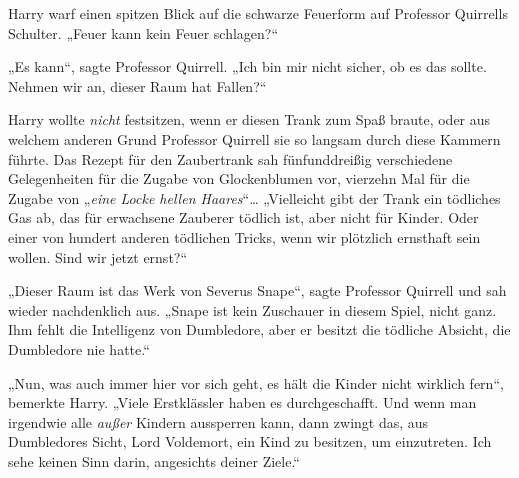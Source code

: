 Harry warf einen spitzen Blick auf die schwarze Feuerform auf Professor Quirrells Schulter. „Feuer kann kein Feuer schlagen?“

„Es kann“, sagte Professor Quirrell. „Ich bin mir nicht sicher, ob es das sollte. Nehmen wir an, dieser Raum hat Fallen?“

Harry wollte \emph{nicht} festsitzen, wenn er diesen Trank zum Spaß braute, oder aus welchem anderen Grund Professor Quirrell sie so langsam durch diese Kammern führte. Das Rezept für den Zaubertrank sah fünfunddreißig verschiedene Gelegenheiten für die Zugabe von Glockenblumen vor, vierzehn Mal für die Zugabe von „\emph{eine Locke hellen Haares}“…
„Vielleicht gibt der Trank ein tödliches Gas ab, das für erwachsene Zauberer tödlich ist, aber nicht für Kinder. Oder einer von hundert anderen tödlichen Tricks, wenn wir plötzlich ernsthaft sein wollen. Sind wir jetzt ernst?“

„Dieser Raum ist das Werk von Severus Snape“, sagte Professor Quirrell und sah wieder nachdenklich aus. „Snape ist kein Zuschauer in diesem Spiel, nicht ganz. Ihm fehlt die Intelligenz von Dumbledore, aber er besitzt die tödliche Absicht, die Dumbledore nie hatte.“

„Nun, was auch immer hier vor sich geht, es hält die Kinder nicht wirklich fern“, bemerkte Harry. „Viele Erstklässler haben es durchgeschafft. Und wenn man irgendwie alle \emph{außer} Kindern aussperren kann, dann zwingt das, aus Dumbledores Sicht, Lord Voldemort, ein Kind zu besitzen, um einzutreten. Ich sehe keinen Sinn darin, angesichts deiner Ziele.“

